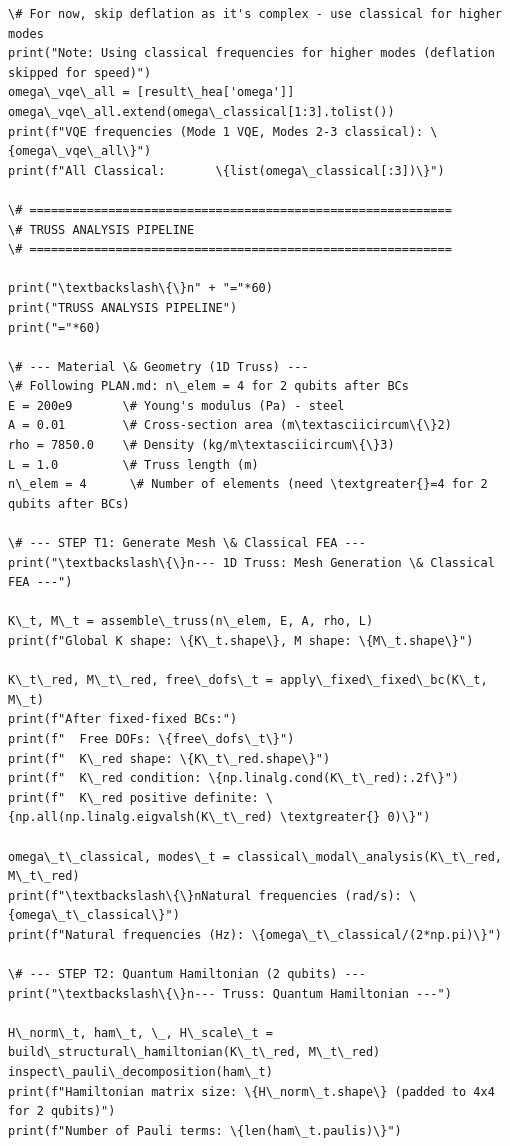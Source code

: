 \documentclass[12pt, a4paper]{article}
\begin{document}
\begin{lstlisting}[style=codestyle, caption={{main.py --- Pipeline Orchestrator}}]
\# For now, skip deflation as it's complex - use classical for higher modes
print("Note: Using classical frequencies for higher modes (deflation skipped for speed)")
omega\_vqe\_all = [result\_hea['omega']]
omega\_vqe\_all.extend(omega\_classical[1:3].tolist())
print(f"VQE frequencies (Mode 1 VQE, Modes 2-3 classical): \{omega\_vqe\_all\}")
print(f"All Classical:       \{list(omega\_classical[:3])\}")

\# ===========================================================
\# TRUSS ANALYSIS PIPELINE
\# ===========================================================

print("\textbackslash\{\}n" + "="*60)
print("TRUSS ANALYSIS PIPELINE")
print("="*60)

\# --- Material \& Geometry (1D Truss) ---
\# Following PLAN.md: n\_elem = 4 for 2 qubits after BCs
E = 200e9       \# Young's modulus (Pa) - steel
A = 0.01        \# Cross-section area (m\textasciicircum\{\}2)
rho = 7850.0    \# Density (kg/m\textasciicircum\{\}3)
L = 1.0         \# Truss length (m)
n\_elem = 4      \# Number of elements (need \textgreater{}=4 for 2 qubits after BCs)

\# --- STEP T1: Generate Mesh \& Classical FEA ---
print("\textbackslash\{\}n--- 1D Truss: Mesh Generation \& Classical FEA ---")

K\_t, M\_t = assemble\_truss(n\_elem, E, A, rho, L)
print(f"Global K shape: \{K\_t.shape\}, M shape: \{M\_t.shape\}")

K\_t\_red, M\_t\_red, free\_dofs\_t = apply\_fixed\_fixed\_bc(K\_t, M\_t)
print(f"After fixed-fixed BCs:")
print(f"  Free DOFs: \{free\_dofs\_t\}")
print(f"  K\_red shape: \{K\_t\_red.shape\}")
print(f"  K\_red condition: \{np.linalg.cond(K\_t\_red):.2f\}")
print(f"  K\_red positive definite: \{np.all(np.linalg.eigvalsh(K\_t\_red) \textgreater{} 0)\}")

omega\_t\_classical, modes\_t = classical\_modal\_analysis(K\_t\_red, M\_t\_red)
print(f"\textbackslash\{\}nNatural frequencies (rad/s): \{omega\_t\_classical\}")
print(f"Natural frequencies (Hz): \{omega\_t\_classical/(2*np.pi)\}")

\# --- STEP T2: Quantum Hamiltonian (2 qubits) ---
print("\textbackslash\{\}n--- Truss: Quantum Hamiltonian ---")

H\_norm\_t, ham\_t, \_, H\_scale\_t = build\_structural\_hamiltonian(K\_t\_red, M\_t\_red)
inspect\_pauli\_decomposition(ham\_t)
print(f"Hamiltonian matrix size: \{H\_norm\_t.shape\} (padded to 4x4 for 2 qubits)")
print(f"Number of Pauli terms: \{len(ham\_t.paulis)\}")


\end{lstlisting}
\end{document}
